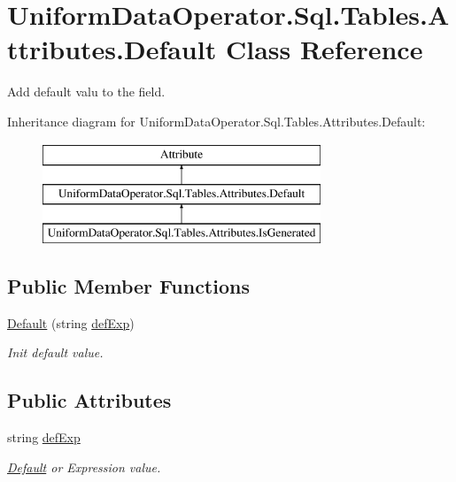 \hypertarget{class_uniform_data_operator_1_1_sql_1_1_tables_1_1_attributes_1_1_default}{}\section{Uniform\+Data\+Operator.\+Sql.\+Tables.\+Attributes.\+Default Class Reference}
\label{class_uniform_data_operator_1_1_sql_1_1_tables_1_1_attributes_1_1_default}


Add default valu to the field.  


Inheritance diagram for Uniform\+Data\+Operator.\+Sql.\+Tables.\+Attributes.\+Default\+:\begin{figure}[H]
\begin{center}
\leavevmode
\includegraphics[height=3.000000cm]{d1/d7d/class_uniform_data_operator_1_1_sql_1_1_tables_1_1_attributes_1_1_default}
\end{center}
\end{figure}
\subsection*{Public Member Functions}
\begin{DoxyCompactItemize}
\item 
\mbox{\hyperlink{class_uniform_data_operator_1_1_sql_1_1_tables_1_1_attributes_1_1_default_a727920a02bdfc4af5fb187729f048ca5}{Default}} (string \mbox{\hyperlink{class_uniform_data_operator_1_1_sql_1_1_tables_1_1_attributes_1_1_default_af6b009142552ad61a6e17e9dd401b84e}{def\+Exp}})
\begin{DoxyCompactList}\small\item\em Init default value. \end{DoxyCompactList}\end{DoxyCompactItemize}
\subsection*{Public Attributes}
\begin{DoxyCompactItemize}
\item 
string \mbox{\hyperlink{class_uniform_data_operator_1_1_sql_1_1_tables_1_1_attributes_1_1_default_af6b009142552ad61a6e17e9dd401b84e}{def\+Exp}}
\begin{DoxyCompactList}\small\item\em \mbox{\hyperlink{class_uniform_data_operator_1_1_sql_1_1_tables_1_1_attributes_1_1_default}{Default}} or Expression value. \end{DoxyCompactList}\end{DoxyCompactItemize}


